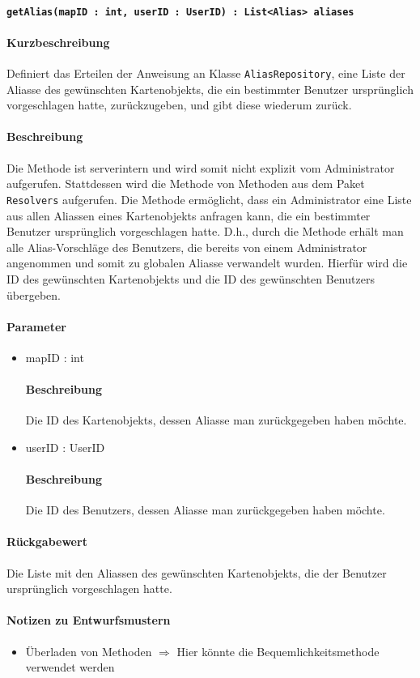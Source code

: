 \paragraph{\texttt{getAlias(mapID : int, userID : UserID) : List<Alias> aliases}}%
\paragraph*{Kurzbeschreibung}
Definiert das Erteilen der Anweisung an Klasse \texttt{AliasRepository}, eine Liste der Aliasse des gewünschten Kartenobjekts, die ein bestimmter Benutzer ursprünglich vorgeschlagen hatte, zurückzugeben, und gibt diese wiederum zurück.
\paragraph*{Beschreibung}
Die Methode ist serverintern und wird somit nicht explizit vom Administrator aufgerufen.
Stattdessen wird die Methode von Methoden aus dem Paket \texttt{Resolvers} aufgerufen.
Die Methode ermöglicht, dass ein Administrator eine Liste aus allen Aliassen eines Kartenobjekts anfragen kann, die ein bestimmter Benutzer ursprünglich vorgeschlagen hatte.
D.h., durch die Methode erhält man alle Alias-Vorschläge des Benutzers, die bereits von einem Administrator angenommen und somit zu globalen Aliasse verwandelt wurden.
Hierfür wird die ID des gewünschten Kartenobjekts und die ID des gewünschten Benutzers übergeben.
\paragraph*{Parameter}
\begin{itemize}
    \item mapID : int
    		\paragraph*{Beschreibung}
    		Die ID des Kartenobjekts, dessen Aliasse man zurückgegeben haben möchte.
    	\item userID : UserID
    		\paragraph*{Beschreibung}
    		Die ID des Benutzers, dessen Aliasse man zurückgegeben haben möchte.
\end{itemize}
\paragraph*{Rückgabewert}
Die Liste mit den Aliassen des gewünschten Kartenobjekts, die der Benutzer ursprünglich vorgeschlagen hatte.

\paragraph*{Notizen zu Entwurfsmustern}
\begin{itemize}
	\item Überladen von Methoden $\Rightarrow$ Hier könnte die Bequemlichkeitsmethode verwendet werden
\end{itemize}
